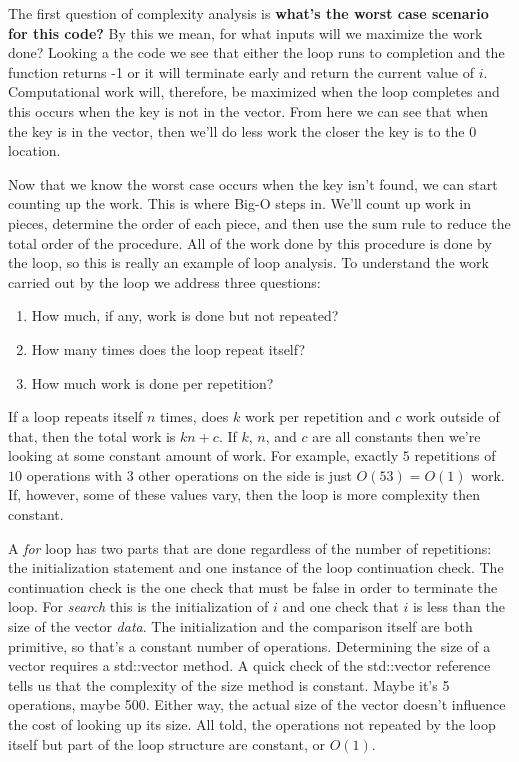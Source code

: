 \documentclass[]{tufte-handout}
\begin{document}
The first question of complexity analysis is \textbf{what's the worst case scenario for this code?} By this we mean, for what inputs will we maximize the work done? Looking a the code we see that either the loop runs to completion and the function returns -1 or it will terminate early and return the current value of $i$. Computational work will, therefore, be maximized when the loop completes and this occurs when the key is not in the vector. From here we can see that when the key is in the vector, then we'll do less work the closer the key is to the $0$ location. 

Now that we know the worst case occurs when the key isn't found, we can start counting up the work. This is where Big-O steps in. We'll count up work in pieces, determine the order of each piece, and then use the sum rule to reduce the total order of the procedure. All of the work done by this procedure is done by the loop, so this is really an example of loop analysis. To understand the work carried out by the loop we address three questions:
\begin{enumerate}
\item How much, if any, work is done but not repeated?
\item How many times does the loop repeat itself?
\item How much work is done per repetition?
\end{enumerate}
If a loop repeats itself $n$ times, does $k$ work per repetition and $c$ work outside of that, then the total work is $kn+c$. If $k$, $n$, and $c$ are all constants then we're looking at some constant amount of work. For example, exactly $5$ repetitions of $10$ operations with $3$ other operations on the side is just $O(53) = O(1)$ work. If, however, some of these values vary, then the loop is more complexity then constant. 

A \textit{for} loop has two parts that are done regardless of the number of repetitions: the initialization statement and one instance of the loop continuation check. The continuation check is the one check that must be false in order to terminate the loop. For \textit{search} this is the initialization of $i$ and one check that $i$ is less than the size of the vector \textit{data}. The initialization and the comparison itself are both primitive, so that's a constant number of operations. Determining the size of a vector requires a std::vector method.  A quick check of the std::vector reference tells us that the complexity of the size method is constant. Maybe it's 5 operations, maybe 500. Either way, the actual size of the vector doesn't influence the cost of looking up its size. All told, the operations not repeated by the loop itself but part of the loop structure are constant, or $O(1)$.
\end{document}
